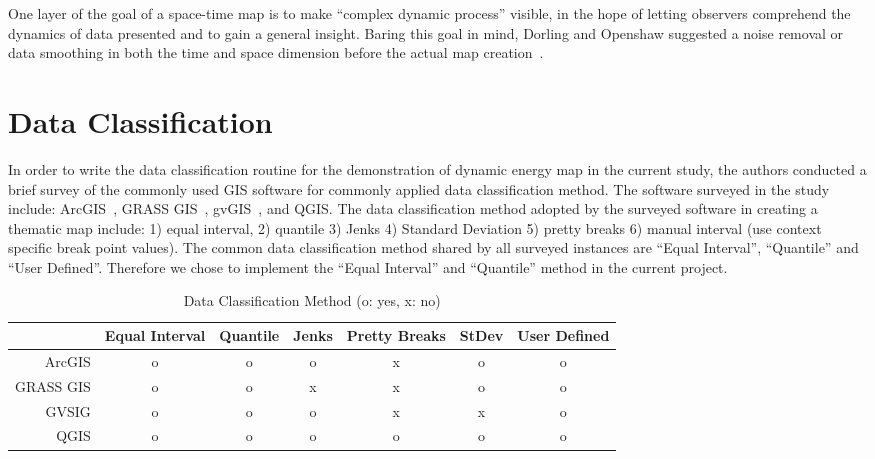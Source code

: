 One layer of the goal of a space-time map is to make ``complex dynamic
process'' visible, in the hope of letting observers comprehend the
dynamics of data presented and to gain a general insight. Baring this
goal in mind, Dorling and Openshaw suggested a noise removal or data
smoothing in both the time and space dimension before the actual map
creation~\cite{Dorling1992}.

\section{Data Classification}\label{dataClassification}
In order to write the data classification routine for the
demonstration of dynamic energy map in the current study, the authors
conducted a brief survey of the commonly used GIS software for
commonly applied data classification method. The software surveyed in
the study include: ArcGIS~\cite{GIS_Jenks2014}, GRASS
GIS~\cite{GRASSGIS2008}, gvGIS~\cite{gvGIS2011}, and QGIS. The data
classification method adopted by the surveyed software in creating a
thematic map include: 1) equal interval, 2) quantile 3) Jenks 4)
Standard Deviation 5) pretty breaks 6) manual interval (use context
specific break point values). The common data classification method
shared by all surveyed instances are ``Equal Interval'', ``Quantile''
and ``User Defined''. Therefore we chose to implement the ``Equal
Interval'' and ``Quantile'' method in the current project.

\begin{table}[h!]
  \centering
  \begin{tabular}{r|c c c c c c}
    \hline
           & Equal Interval & Quantile & Jenks & Pretty Breaks & StDev & User Defined\\
    \hline
    ArcGIS &      o        &    o     &  o    & x &  o  &   o  \\
 GRASS GIS &      o        &    o     &  x    & x &  o  &   o  \\
     GVSIG &      o        &    o     &  o    & x &  x  &   o  \\
      QGIS &      o        &    o     &  o    & o &  o  &   o  \\
    \hline
  \end{tabular}
  \caption{Data Classification Method (o: yes, x: no)}
  \label{tab:classify}
\end{table}

